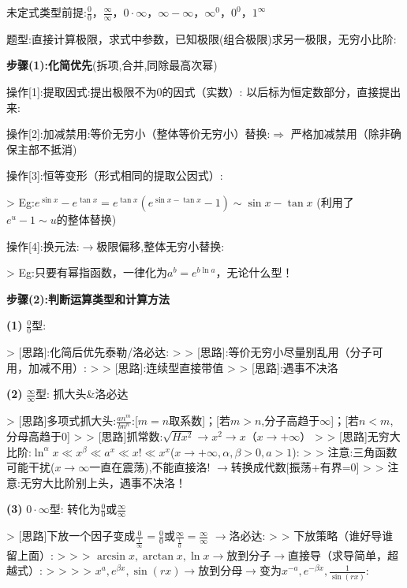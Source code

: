 \documentclass[11pt,a4paper,UTF8]{ctexart}
\begin{document}
\begin{thmbox}[{解法[6]: [微分]7种未定式计算}]

    未定式类型前提:$\frac{0}{0}$，$\frac{\infty}{\infty}$，$0 \cdot \infty$，$\infty - \infty$，$\infty^0$，$0^0$，$1^\infty$

    题型:直接计算极限，求式中参数，已知极限(组合极限)求另一极限，无穷小比阶:

    \textbf{步骤(1):化简优先}(拆项,合并,同除最高次幂)

    操作[1]:提取因式:提出极限不为$0$的因式（实数）: 以后标为恒定数部分，直接提出来:

    操作[2]:加减禁用:等价无穷小（整体等价无穷小）替换:$\Rightarrow$ 严格加减禁用（除非确保主部不抵消)

    操作[3]:恒等变形（形式相同的提取公因式）:

    >   Eg:$e^{\sin x} - e^{\tan x} = e^{\tan x}(e^{\sin x - \tan x} - 1) \sim \sin x - \tan x$	(利用了$e^u - 1 \sim u$的整体替换)

    操作[4]:换元法:$\to$极限偏移,整体无穷小替换:

    >   Eg:只要有幂指函数，一律化为$a^b = e^{b \ln a}$，无论什么型！

    \textbf{步骤(2):判断运算类型和计算方法}

\textbf{(1)} $\frac{0}{0}$型:

    >   [思路]:化简后优先泰勒/洛必达:
    >
    >   [思路]:等价无穷小尽量别乱用（分子可用，加减不用）:
    >
    >   [思路]:连续型直接带值
    >
    >   [思路]:遇事不决洛

\textbf{(2)} $\frac{\infty}{\infty}$型: 抓大头\&洛必达

    >   [思路]多项式抓大头:$\frac{an^m}{bn^n}$:[$m=n$取系数]；[若$m>n$,分子高趋于$\infty$]；[若$n<m$,分母高趋于$0$]
    >
    >   [思路]抓常数:$\sqrt{H x^2} \to x^2 \to x$（$x \to +\infty$）
    >
    >   [思路]无穷大比阶:$\ln^\alpha x \ll x^\beta \ll a^x \ll x! \ll x^x$($x \to +\infty, \alpha,\beta>0, a>1$):
    >
    >   注意:三角函数可能干扰($x\to \infty$一直在震荡),不能直接洛! $\to$转换成代数[振荡+有界=0]
    >
    >   注意:无穷大比阶别上头，遇事不决洛！

\textbf{(3)} $0 \cdot \infty$型: 转化为$\frac{0}{0}$或$\frac{\infty}{\infty}$

    >   [思路]下放一个因子变成$\frac{0}{\frac{1}{\infty}} = \frac{0}{0}$或$\frac{\infty}{\frac{1}{0}} = \frac{\infty}{\infty}$ $\to$洛必达:
    >
    >   下放策略（谁好导谁留上面）:
    >
    >   >   $\arcsin x, \arctan x, \ln x \to$放到分子$\to$直接导（求导简单，超越式）:
    >   >
    >   >   $x^a, e^{\beta x}, \sin(rx) \to$放到分母$\to$变为$x^{-a}, e^{-\beta x}, \frac{1}{\sin(rx)}$:


\end{thmbox}
\end{document}
